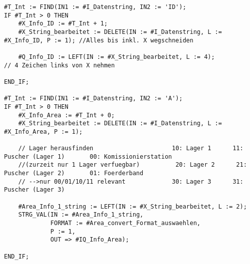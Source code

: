     \begin{lstlisting}[language=SCL, caption={SCL Baustein \enquote{ID+Area}}, label = SCL-Baustein]
        #T_Int := FIND(IN1 := #I_Datenstring, IN2 := 'ID');
IF #T_Int > 0 THEN
    #X_Info_ID := #T_Int + 1;
    #X_String_bearbeitet := DELETE(IN := #I_Datenstring, L := #X_Info_ID, P := 1); //Alles bis inkl. X wegschneiden
    
    #Q_Info_ID := LEFT(IN := #X_String_bearbeitet, L := 4);               // 4 Zeichen links von X nehmen
    
END_IF;

#T_Int := FIND(IN1 := #I_Datenstring, IN2 := 'A');
IF #T_Int > 0 THEN
    #X_Info_Area := #T_Int + 0;
    #X_String_bearbeitet := DELETE(IN := #I_Datenstring, L := #X_Info_Area, P := 1);
    
    // Lager herausfinden                      10: Lager 1      11: Puscher (Lager 1)       00: Komissionierstation
    //(zurzeit nur 1 Lager verfuegbar)          20: Lager 2      21: Puscher (Lager 2)       01: Foerderband
    // -->nur 00/01/10/11 relevant             30: Lager 3      31: Puscher (Lager 3)
    
    #Area_Info_1_string := LEFT(IN := #X_String_bearbeitet, L := 2);
    STRG_VAL(IN := #Area_Info_1_string,                                         
             FORMAT := #Area_convert_Format_auswaehlen,
             P := 1,
             OUT => #IQ_Info_Area);
    
END_IF;
    \end{lstlisting}


